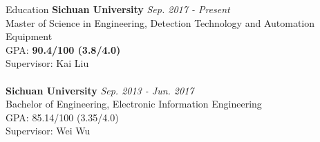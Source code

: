 \documentclass{resume} %
\begin{document}
\begin{rSection}{Education}
	{\bf Sichuan University} \hfill {\em Sep. 2017 - Present} 
	\\ Master of Science in Engineering, Detection Technology and Automation Equipment\\ GPA: \textbf{90.4/100 (3.8/4.0)}\\
	Supervisor: Kai Liu\\
	\\{\bf Sichuan University} \hfill {\em Sep. 2013 - Jun. 2017} 
	\\ Bachelor of Engineering, Electronic Information Engineering\\GPA: 85.14/100 (3.35/4.0)\\
	Supervisor: Wei Wu
\end{rSection}
\end{document}
